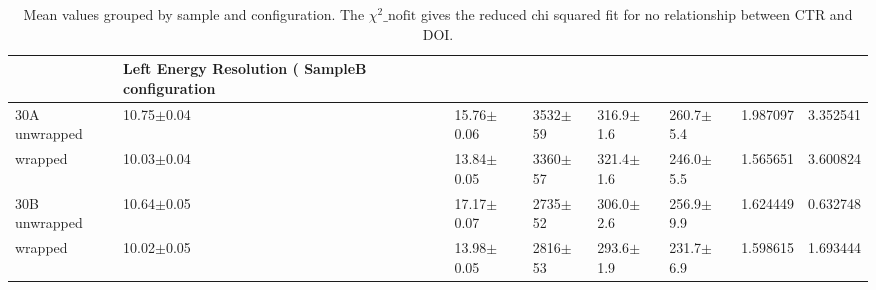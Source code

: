 \begin{table}
\caption{\label{tab:doiresults} Mean values grouped by sample and configuration. The $\chi^2\_\text{nofit}$ gives the reduced chi squared fit for no relationship between CTR and DOI.}
\begin{tabular}{llllllrr}
\hline
& Left Energy Resolution (%
SampleB configuration &                      &                  &              &                &                &             &                        \\
\hline
30A     unwrapped     &       10.75$\pm$0.04 &   15.76$\pm$0.06 &  3532$\pm$59 &  316.9$\pm$1.6 &  260.7$\pm$5.4 &    1.987097 &               3.352541 \\
        wrapped       &       10.03$\pm$0.04 &   13.84$\pm$0.05 &  3360$\pm$57 &  321.4$\pm$1.6 &  246.0$\pm$5.5 &    1.565651 &               3.600824 \\
30B     unwrapped     &       10.64$\pm$0.05 &   17.17$\pm$0.07 &  2735$\pm$52 &  306.0$\pm$2.6 &  256.9$\pm$9.9 &    1.624449 &               0.632748 \\
        wrapped       &       10.02$\pm$0.05 &   13.98$\pm$0.05 &  2816$\pm$53 &  293.6$\pm$1.9 &  231.7$\pm$6.9 &    1.598615 &               1.693444 \\
\hline
\end{tabular}
\end{table}


